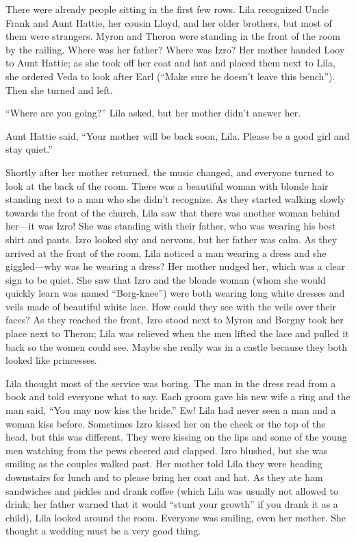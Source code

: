 \documentclass[
  letterpaper,
]{book}
\begin{document}
There were already people sitting in the first few rows. Lila recognized
Uncle Frank and Aunt Hattie, her cousin Lloyd, and her older brothers,
but most of them were strangers. Myron and Theron were standing in the
front of the room by the railing. Where was her father? Where was Izro?
Her mother handed Looy to Aunt Hattie; as she took off her coat and hat
and placed them next to Lila, she ordered Veda to look after Earl
(``Make sure he doesn't leave this bench''). Then she turned and left.

``Where are you going?'' Lila asked, but her mother didn't answer her.

Aunt Hattie said, ``Your mother will be back soon, Lila. Please be a
good girl and stay quiet.''

Shortly after her mother returned, the music changed, and everyone
turned to look at the back of the room. There was a beautiful woman with
blonde hair standing next to a man who she didn't recognize. As they
started walking slowly towards the front of the church, Lila saw that
there was another woman behind her---it was Izro! She was standing with
their father, who was wearing his best shirt and pants. Izro looked shy
and nervous, but her father was calm. As they arrived at the front of
the room, Lila noticed a man wearing a dress and she giggled---why was
he wearing a dress? Her mother nudged her, which was a clear sign to be
quiet. She saw that Izro and the blonde woman (whom she would quickly
learn was named ``Borg-knee'') were both wearing long white dresses and
veils made of beautiful white lace. How could they see with the veils
over their faces? As they reached the front, Izro stood next to Myron
and Borgny took her place next to Theron; Lila was relieved when the men
lifted the lace and pulled it back so the women could see. Maybe she
really was in a castle because they both looked like princesses.

Lila thought most of the service was boring. The man in the dress read
from a book and told everyone what to say. Each groom gave his new wife
a ring and the man said, ``You may now kiss the bride.'' Ew! Lila had
never seen a man and a woman kiss before. Sometimes Izro kissed her on
the cheek or the top of the head, but this was different. They were
kissing on the lips and some of the young men watching from the pews
cheered and clapped. Izro blushed, but she was smiling as the couples
walked past. Her mother told Lila they were heading downstairs for lunch
and to please bring her coat and hat. As they ate ham sandwiches and
pickles and drank coffee (which Lila was usually not allowed to drink;
her father warned that it would ``stunt your growth'' if you drank it as
a child), Lila looked around the room. Everyone was smiling, even her
mother. She thought a wedding must be a very good thing.
\end{document}
